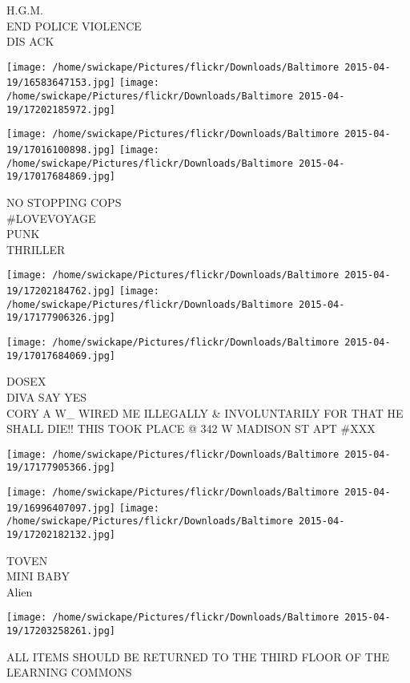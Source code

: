 \documentclass[10pt,letterpaper]{article}
\begin{document}
H.G.M.\\
END POLICE VIOLENCE\\
DIS ACK\\
\pagebreak

\texttt{[image: /home/swickape/Pictures/flickr/Downloads/Baltimore 2015-04-19/16583647153.jpg]}
\texttt{[image: /home/swickape/Pictures/flickr/Downloads/Baltimore 2015-04-19/17202185972.jpg]}

\texttt{[image: /home/swickape/Pictures/flickr/Downloads/Baltimore 2015-04-19/17016100898.jpg]}
\texttt{[image: /home/swickape/Pictures/flickr/Downloads/Baltimore 2015-04-19/17017684869.jpg]}

NO STOPPING COPS\\
\#LOVEVOYAGE\\
PUNK\\
THRILLER\\
\pagebreak

\texttt{[image: /home/swickape/Pictures/flickr/Downloads/Baltimore 2015-04-19/17202184762.jpg]}
\texttt{[image: /home/swickape/Pictures/flickr/Downloads/Baltimore 2015-04-19/17177906326.jpg]}

\vspace{0.25in}
\texttt{[image: /home/swickape/Pictures/flickr/Downloads/Baltimore 2015-04-19/17017684069.jpg]}

DOSEX\\
DIVA SAY YES\\
CORY A W\_ WIRED ME ILLEGALLY \& INVOLUNTARILY FOR THAT HE SHALL DIE!! THIS TOOK PLACE @ 342 W MADISON ST APT \#XXX\\
\pagebreak

\texttt{[image: /home/swickape/Pictures/flickr/Downloads/Baltimore 2015-04-19/17177905366.jpg]}

\vspace{0.25in}
\texttt{[image: /home/swickape/Pictures/flickr/Downloads/Baltimore 2015-04-19/16996407097.jpg]}
\texttt{[image: /home/swickape/Pictures/flickr/Downloads/Baltimore 2015-04-19/17202182132.jpg]}

TOVEN\\
MINI BABY\\
Alien\\
\pagebreak

\texttt{[image: /home/swickape/Pictures/flickr/Downloads/Baltimore 2015-04-19/17203258261.jpg]}

ALL ITEMS SHOULD BE RETURNED TO THE THIRD FLOOR OF THE LEARNING COMMONS\\
\pagebreak
\end{document}
